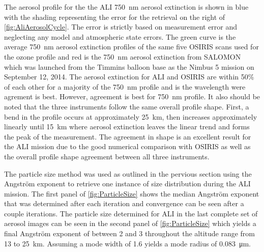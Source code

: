 \documentclass[12pt]{article}
\begin{document}

The aerosol profile for the the ALI 750~nm aerosol extinction is shown in blue with the shading representing the error for the retrieval on the right of \autoref{fig:AliAerosolCycle}. The error is strictly based on measurement error and neglecting any model and atmospheric state errors. The green curve is the average 750~nm aerosol extinction profiles of the same five OSIRIS scans used for the ozone profile and red is the 750~nm aerosol extinction from SALOMON \citep{Berthet2002} which was launched from the Timmins balloon base as the Nimbus 5 mission on September 12, 2014. The aerosol extinction for ALI and OSIRIS are within 50\% of each other for a majority of the 750~nm profile and is the wavelength were agrement is best. However, agreement is best for 750~nm profile. It also should be noted that the three instruments follow the same overall profile shape.  First, a bend in the profile occurs at approximately 25~km, then increases approximately linearly until 15~km where aerosol extinction leaves the linear trend and forms the peak of the measurement. The agreement in shape is an excellent result for the ALI mission due to the good numerical comparison with OSIRIS as well as the overall profile shape agreement between all three instruments.


The particle size method was used as outlined in the pervious section using the Angstr\"{o}m exponent to retrieve one instance of size distribution during the ALI mission. The first panel of \autoref{fig:ParticleSize} shows the median Angstr\"{o}m exponent that was determined after each iteration and convergence can be seen after a couple iterations. The particle size determined for ALI in the last complete set of aerosol images can be seen in the second panel of \autoref{fig:ParticleSize} which yields a final Angstr\"{o}m exponent of between 2 and 3 throughout the altitude range from 13 to 25~km. Assuming a mode width of 1.6 yields a mode radius of 0.083~\si{\micro\metre}.
\end{document}
